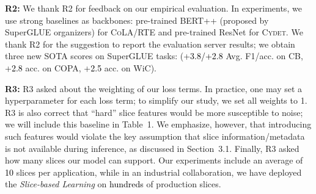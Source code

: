 \documentclass{article}
\newcommand{\yell}[1]{\textcolor{red}{#1}}
\newcommand{\num}[1]{\textcolor{black}{#1}}
\newcommand{\squishlist}{
\begin{list}{$\bullet$}
  { \setlength{\itemsep}{0pt}
    \setlength{\parsep}{1pt}
    \setlength{\topsep}{1pt}
    \setlength{\partopsep}{0pt}
  }
}
\newcommand{\squishend}{\end{list}}
\begin{document}
\textbf{R2:} We thank R2 for feedback on our empirical evaluation.
In experiments, we use strong baselines as backbones: pre-trained \textsc{BERT++} (proposed by SuperGLUE organizers) for \textsc{CoLA}/\textsc{RTE} and pre-trained ResNet for \textsc{Cydet}. 
We thank R2 for the suggestion to report the evaluation server results; we obtain three new SOTA scores on SuperGLUE tasks: (+\num{3.8/+2.8} Avg. F1/acc. on CB, +\num{2.8} acc. on COPA, +\num{2.5} acc. on WiC).


\textbf{R3:} R3 asked about the weighting of our loss terms. 
In practice, one may set a hyperparameter for each loss term; to simplify our study, we set all weights to 1.
R3 is also correct that ``hard'' slice features would be more susceptible to noise; we will include this baseline in Table~1.
We emphasize, however, that introducing such features would violate the key assumption that slice information/metadata is not available during inference, as discussed in Section~3.1.
Finally, R3 asked how many slices our model can support. 
Our experiments include an average of \num{10} slices per application, while in an industrial collaboration, we have deployed the \textit{Slice-based Learning} on \num{hundreds} of production slices.


\end{document}
